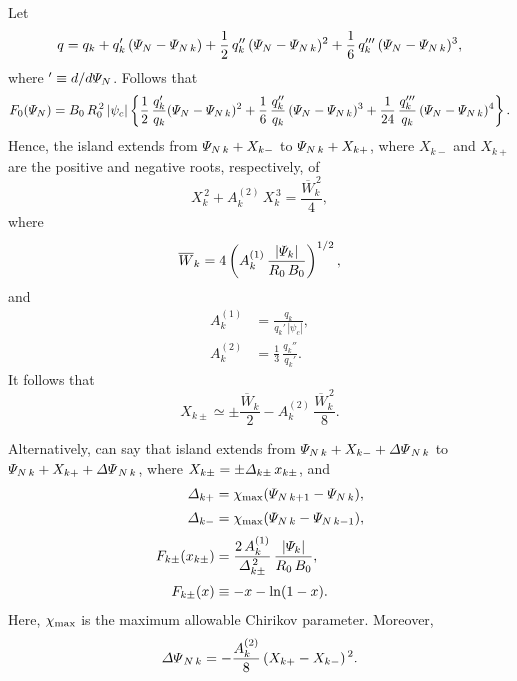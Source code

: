 \documentclass[12pt]{article}
\begin{document}
Let
\begin{equation}
q = q_k + q_k'\,({\mit\Psi}_N-{\mit\Psi}_{N\,k})+ \frac{1}{2}\,q_k''\,({\mit\Psi}_N-{\mit\Psi}_{N\,k})^2+ \frac{1}{6}\,q_k'''\,({\mit\Psi}_N-{\mit\Psi}_{N\,k})^3,
\end{equation}
where $'\equiv d/d{\mit\Psi}_N$. Follows that
\begin{equation}
F_0({\mit\Psi}_N) = B_0\,R_0^{\,2}\,|\psi_c|\left\{\frac{1}{2}\,\frac{q_k'}{q_k}({\mit\Psi}_N-{\mit\Psi}_{N\,k})^2+  \frac{1}{6}\,\frac{q_k''}{q_k}\,({\mit\Psi}_N-{\mit\Psi}_{N\,k})^3+ \frac{1}{24}\,
\frac{q_k'''}{q_k}\,({\mit\Psi}_N-{\mit\Psi}_{N\,k})^4\right\}.
\end{equation}
Hence, the island extends from  ${\mit\Psi}_{N\,k}+X_{k-}$ to ${\mit\Psi}_{N\,k}+X_{k+}$, where $X_{k-}$ and $X_{k+}$ are the
positive and negative roots, respectively, of 
\begin{equation}
X_k^{\,2}+  A_k^{(2)}\,X_k^{\,3}= \frac{\overline{W}_k^{\,2}}{4},
\end{equation}
where
\begin{equation}
\overline{W}_k=4\left(A_k^{(1)}\,\frac{|{\mit\Psi}_k|}{R_0\,B_0}\right)^{1/2},
\end{equation}
and
\begin{align}
A_k^{(1)} &= \frac{q_k}{q_k'\,|\psi_c|},\\[0.5ex]
A_k^{(2)}& =  \frac{1}{3}\,\frac{q_k''}{q_k'}.
\end{align}
It follows that
\begin{equation}
X_{k\pm} \simeq \pm \frac{\overline{W}_k}{2} - A_k^{(2)}\,\frac{\overline{W}_k^{\,2}}{8}.
\end{equation}

Alternatively, can say that island extends from  ${\mit\Psi}_{N\,k}+X_{k-} + {\mit\Delta\Psi}_{N\,k}$ to ${\mit\Psi}_{N\,k}+X_{k+}+{\mit\Delta\Psi}_{N\,k}$,
where $X_{k\pm} = \pm{\mit\Delta}_{k\pm}\,x_{k\pm}$,
and
\begin{align}
{\mit\Delta}_{k+} &= \chi_{\rm max}({\mit\Psi}_{N\,k+1}-{\mit\Psi}_{N\,k}),\\[0.5ex]
{\mit\Delta}_{k-} &=\chi_{\rm max}( {\mit\Psi}_{N\,k}-{\mit\Psi}_{N\,k-1}),\\[0.5ex]
F_{k\pm}(x_{k\pm}) &= \frac{2\,A_k^{(1)}}{{\mit\Delta}_{k\pm}^{\,2}}\,\frac{|{\mit\Psi}_k|}{R_0\,B_0},\\[0.5ex]
F_{k\pm}(x)&\equiv - x -\ln(1-x).
\end{align}
Here,  $\chi_{\rm max}$ is the maximum allowable Chirikov parameter.
Moreover,
\begin{equation}
{\mit\Delta\Psi}_{N\,k } = -\frac{A_k^{(2)}}{8}\,(X_{k+}-X_{k-})^{\,2}.
\end{equation}
\end{document}
